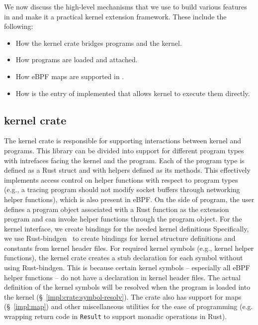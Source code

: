 We now discuss the high-level mechanisms that we use to build various features in
    \projname{} and make it a practical kernel extension framework.
These include the following:
\begin{itemize}
    \item How the \projname{} kernel crate bridges programs and the kernel.
    \item How \projname{} programs are loaded and attached.
    \item How eBPF maps are supported in \projname{}.
    \item How is the entry of \projname{} implemented that allows kernel to
        execute them directly.
\end{itemize}

\subsection{\projname{} kernel crate}

The \projname{} kernel crate is responsible for supporting interactions between
    kernel and \projname{} programs.
This library can be divided into support for different program types with
    intrefaces facing the kernel and the \projname{} program.
Each of the program type is defined as a Rust struct and with helpers defined
    as its methods.
This effectively implements access control on helper functions with respect to
    program types (e.g., a tracing program should not modify socket buffers
    through networking helper functions), which is also present in eBPF.
On the side of \projname{} program, the user defines a program object
    associated with a Rust function as the extension program and can invoke
    helper functions through the program object.
For the kernel interface, we create bindings for the needed kernel definitions
Specifically, we use Rust-bindgen~\cite{bindgen} to create bindings for kernel
    structure definitions and constants from kernel header files.
For required kernel symbols (e.g., kernel helper functions), the kernel crate
    creates a stub declaration for each symbol without using Rust-bindgen.
This is because certain kernel symbols -- especially all eBPF helper
    functions --  do not have a declaration in kernel header files.
The actual definition of the kernel symbols will be resolved when the program
    is loaded into the kernel (\S~\ref{impl:crate:symbol-resolv}).
The crate also has support for maps (\S~\ref{impl:map}) and other
    miscellaneous utilities for the ease of programming (e.g. wrapping return
    code in \texttt{Result} to support monadic operations in Rust).

